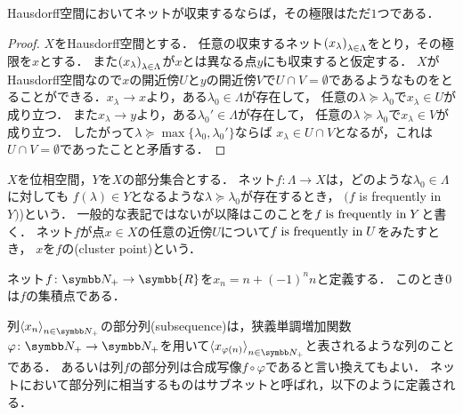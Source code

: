 \documentclass{ltjsbook}
\begin{document}
\begin{thmbox}
\begin{proposition}
Hausdorff空間においてネットが収束するならば，その極限はただ\(1\)つである．
\end{proposition}
\end{thmbox}

\begin{proof} \(X\)をHausdorff空間とする．
任意の収束するネット\({({x}_\lambda)}_{\lambda \in \Lambda}\)をとり，その極限を\(x\)とする．
また\({({x}_\lambda)}_{\lambda \in \Lambda}\)が\(x\)とは異なる点\(y\)にも収束すると仮定する．
\(X\)がHausdorff空間なので\(x\)の開近傍\(U\)と\(y\)の開近傍\(V\)で\(U \cap V = \emptyset\)であるようなものをとることができる．\(x_\lambda \to x\)より，ある\(\lambda_0 \in \Lambda\)が存在して，
任意の\(\lambda \succeq \lambda_0\)で\(x_\lambda \in U\)が成り立つ．
また\(x_\lambda \to y\)より，ある\(\lambda_0' \in \Lambda\)が存在して，
任意の\(\lambda \succeq \lambda_0\)で\(x_\lambda \in V\)が成り立つ．
したがって\(\lambda \succeq \max \{\lambda_0, \lambda_0'\}\)ならば
\(x_\lambda \in U \cap V\)となるが，これは\(U \cap V = \emptyset\)であったことと矛盾する．
\end{proof}

\begin{thmbox}
\begin{definition}
\(X\)を位相空間，\(Y\)を\(X\)の部分集合とする．
ネット\(f \colon \Lambda \to X\)は，どのような\(\lambda_0 \in \Lambda\)に対しても
\(f(\lambda) \in Y\)となるような\(\lambda \succeq \lambda_0\)が存在するとき，
\((f\) is frequently in \(Y)\))という．
一般的な表記ではないが以降はこのことを\(f \mathrel{\text{is frequently in}} Y\)と書く．
ネット\(f\)が点\(x \in X\)の任意の近傍\(U\)について\(f \mathrel{\text{is frequently in}} U\)をみたすとき，
\(x\)を\(f\)の(cluster point)という．
\end{definition}
\end{thmbox}

\begin{exa}
ネット\(f\colon \PositiveInteger \to \symbb{R}\)を\(x_n = n + (-1)^n n\)と定義する．
このとき\(0\)は\(f\)の集積点である．
\end{exa}


列\(\Sequencen{x}\)の部分列(subsequence)は，狭義単調増加関数\(\varphi\colon\PositiveInteger\to\PositiveInteger\)を用いて\(\Subsequence{x}\)と表されるような列のことである．
あるいは列\(f\)の部分列は合成写像\(f\circ \varphi\)であると言い換えてもよい．
ネットにおいて部分列に相当するものはサブネットと呼ばれ，以下のように定義される．
\end{document}
